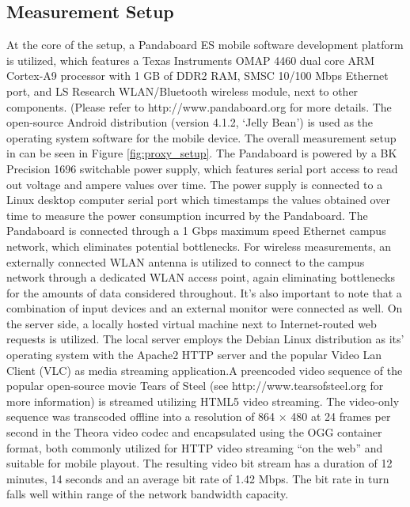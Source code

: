 \subsection*{Measurement Setup}
At the core of the setup, a Pandaboard ES mobile
software development platform is utilized, which features a Texas Instruments OMAP 4460 dual core ARM Cortex-A9 processor with
1 GB of DDR2 RAM, SMSC 10/100 Mbps Ethernet port, and
LS Research WLAN/Bluetooth wireless module, next to other
components. (Please refer to http://www.pandaboard.org for
more details. The open-source Android distribution
(version 4.1.2, ‘Jelly Bean’)  is used as the operating system software for the mobile device.
The overall measurement setup in can be seen in Figure \ref{fig:proxy_setup}. The
Pandaboard is powered by a BK Precision 1696 switchable
power supply, which features serial port access to read out
voltage and ampere values over time. The power
supply is connected to a Linux desktop computer serial port which timestamps
the values obtained over time to measure the power consumption
incurred by the Pandaboard. The Pandaboard is connected
through a 1 Gbps maximum speed Ethernet campus network,
which eliminates potential bottlenecks. For wireless measurements,
an externally connected WLAN antenna is utilized to
connect to the campus network through a dedicated WLAN access point, again eliminating bottlenecks for the
amounts of data considered throughout. It's also important to note
that a combination of input devices and an external monitor
were connected as well.
On the server side, a locally hosted virtual
machine next to Internet-routed web requests is utilized. The local server employs the Debian Linux distribution as its' operating system
with the Apache2 HTTP server and the popular Video Lan
Client (VLC) as media streaming application.A preencoded
video sequence of the popular open-source movie Tears
of Steel (see http://www.tearsofsteel.org for more information) is streamed utilizing HTML5 video streaming. The video-only sequence
was transcoded offline into a resolution of 864 × 480 at 24
frames per second in the Theora video codec and encapsulated
using the OGG container format, both commonly utilized for
HTTP video streaming “on the web” and suitable for mobile
playout. The resulting video bit stream has a duration of 12
minutes, 14 seconds and an average bit rate of 1.42 Mbps.
The bit rate in turn falls well within range of the network
bandwidth capacity.


